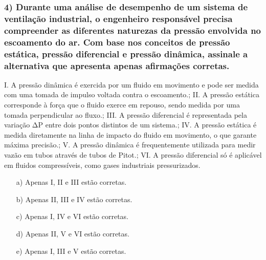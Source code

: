 \documentclass[12pt]{beamer}
\begin{document}
\begin{frame}
\frametitle{4) Durante uma análise de desempenho de um sistema de ventilação industrial, o engenheiro responsável precisa compreender as diferentes naturezas da pressão envolvida no escoamento do ar. Com base nos conceitos de pressão estática, pressão diferencial e pressão dinâmica, assinale a alternativa que apresenta apenas afirmações corretas.}
{\BodySize
\par I. A pressão dinâmica é exercida por um fluido em movimento e pode ser medida com uma tomada de impulso voltada contra o escoamento.; II. A pressão estática corresponde à força que o fluido exerce em repouso, sendo medida por uma tomada perpendicular ao fluxo.; III. A pressão diferencial é representada pela variação ΔP entre dois pontos distintos de um sistema.; IV. A pressão estática é medida diretamente na linha de impacto do fluido em movimento, o que garante máxima precisão.; V. A pressão dinâmica é frequentemente utilizada para medir vazão em tubos através de tubos de Pitot.; VI. A pressão diferencial só é aplicável em fluidos compressíveis, como gases industriais pressurizados.
\begin{itemize}
\item[a)] Apenas I, II e III estão corretas.
\item[b)] Apenas II, III e IV estão corretas.
\item[c)] Apenas I, IV e VI estão corretas.
\item[d)] Apenas II, V e VI estão corretas.
\item[e)] Apenas I, III e V estão corretas.
\end{itemize}
}
\end{frame}
\end{document}
